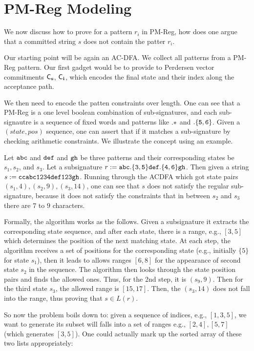 \section{PM-Reg Modeling}
We now discuss how to prove for a pattern $r_i$ in PM-Reg,
how does one argue that a committed string $s$
does not contain the patter $r_i$.

Our starting point will be again an AC-DFA. We collect
all patterns from a PM-Reg pattern.
Our first gadget would be to provide to Perdersen vector
commitments ${\mathsf{C}}_{{{\mathbf {s}}}}$, ${\mathsf{C}}_{{{\mathbf {i}}}}$,
which encodes the final state and their index along the acceptance path.

We then need to encode the patten constraints over length. One can see
that a PM-Reg is a one level boolean combination of sub-signatures, and
each sub-signautre is a sequence of fixed words and
patterns like ${\tt .*}$ and ${\tt .\{5,6\}}$. Given
a $(state, pos)$ sequence, one can assert that if it
matches a sub-signature by checking arithmetic constraints.
We illustrate the concept using an example.

\begin{example} Let ${\tt abc}$ and ${\tt def}$ and ${\tt gh}$
be three patterns and their corresponding states be 
$s_1, s_2$, and $s_3$. Let a subsignature
$r := {\tt abc.\{3,5\}def.\{4,6\}gh}$. Then given
a string $s := {\tt ccabc1234def123gh}$. Running
through the ACDFA which got state pairs
$(s_1, 4), (s_2, 9), (s_3, 14)$,  one can see that
$s$ does not satisfy the regular sub-signature, because
it does not satisfy the constraints that in between
$s_2$ and $s_3$ there are $7$ to $9$ characters.

Formally, the algorithm works as the follows. Given a subsignature
it extracts the corresponding state sequence, and after
each state, there is a range, e.g., $[3,5]$ which determines the
position of the next matching state. At each step, the algorithm
receives a set of positions for the corresponding state (e.g.,
initially $\{5\}$ for state $s_1$), then it leads to allows
ranges $[6,8]$ for the appearance of second state $s_2$ in the sequence.
The algorithm then looks through the state position pairs and finds
the allowed ones. Thus, for the 2nd step, it is $(s_9, 9)$.
Then for the third state $s_3$, the allowed range is
$[15, 17]$. Then, the $(s_3, 14)$ does not fall into the range,
thus proving that $s \in L(r)$.
\end{example}

So now the problem boils down to: given a sequence of 
indices, e.g., $[1, 3, 5]$, we want to generate its subset
will falls into a set of ranges e.g., $[2,4], [5,7]$
(which generates $[3,5]$). One could actually mark up
the sorted array of these two lists appropriately:

